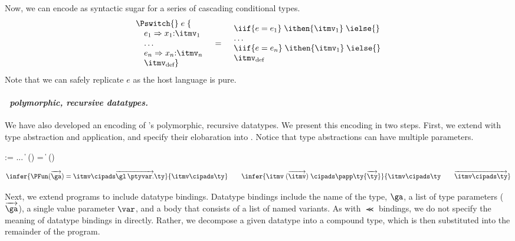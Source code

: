 Now, we can encode \Pswitch{} as syntactic sugar for a series of cascading
conditional types.
{\small
\[
\begin{array}{l}
\Pswitch{}\;e\;\{\\
\quad e_1 \Rightarrow x_1{:}\itmv_1\\ 
\quad \dots \\
\quad e_n \Rightarrow x_n{:}\itmv_n\\
\quad \itmv_{\text{def}} \}
\end{array}
\quad
 \mathbf{=}
\quad
\begin{array}{l} 
    \iif {e = e_1}\; \ithen {\itmv_1}\; \ielse{}\\
    \dots\\
    \iif {e = e_n}\; \ithen {\itmv_1}\; \ielse{}\\
    \itmv_{\text{def}}
\end{array}
\]}%
\noindent
Note that we can safely replicate $e$ as the
host language is pure.

\paragraph{\em \padsml\ polymorphic, recursive datatypes.}
We have also developed an encoding of \padsml{}'s polymorphic,
recursive datatypes. We present this encoding in two steps. First, we
extend \ipads{} with type abstraction and application, and specify
their elobaration into \ddc{}. Notice that \ipads{} type abstractions
can have multiple parameters.
\begin{bnf}
   \meta{\itmv} \::= ... \| 
\PFun{}\; (\overrightarrow \alpha) = \itmv
  \|   \itmv \; (\overrightarrow \itmv)

\end{bnf}
\[
  \infer{ 
     \PFun (\overrightarrow \ga) = \itmv \cipads \overrightarrow{\gl\,\ptyvar.}\ty
  }{
    \itmv \cipads \ty
  }
\qquad
  \infer{ 
     \itmv \; (\overrightarrow {\itmv}) \; \cipads \papp \ty
     {\overrightarrow {\ty}}
  }{
     \itmv \cipads \ty \qquad \overrightarrow {\itmv \cipads \ty}
  }
\]

Next, we extend \ipads{} programs to include datatype bindings.
Datatype bindings include the name of the type, $\ga$, a list of type
parameters ($\overrightarrow \ga$), a single value parameter $\var$, and a body
that consists of a list of named variants. As with $\Prec$ bindings,
we do not specify the meaning of datatype bindings in \ddc{} directly.
Rather, we decompose a given datatype into a compound \ipads{} type,
which is then substituted into the remainder of the program.


